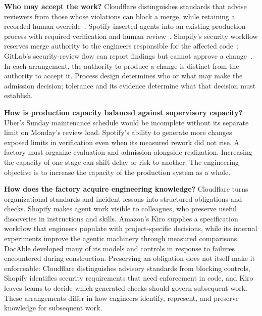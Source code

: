 \textbf{Who may accept the work?} Cloudflare distinguishes standards that advise reviewers from those whose violations can block a merge, while retaining a recorded human override~\citep{skidmore2026review}. Spotify inserted agents into an existing production process with required verification and human review~\citep{charas2025honk,curtis2026spotifyqcon}. Shopify's security workflow reserves merge authority to the engineers responsible for the affected code~\citep{son2026security}; GitLab's security-review flow can report findings but cannot approve a change~\citep{gitlab2026securityreview}. In each arrangement, the authority to produce a change is distinct from the authority to accept it. Process design determines who or what may make the admission decision; tolerance and its evidence determine what that decision must establish.


\textbf{How is production capacity balanced against supervisory capacity?} Uber's Sunday maintenance schedule would be incomplete without its separate limit on Monday's review load. Spotify's ability to generate more changes exposed limits in verification even when its measured rework did not rise. A factory must organize evaluation and admission alongside realization. Increasing the capacity of one stage can shift delay or risk to another. The engineering objective is to increase the capacity of the production system as a whole.


\textbf{How does the factory acquire engineering knowledge?} Cloudflare turns organizational standards and incident lessons into structured obligations and checks. Shopify makes agent work visible to colleagues, who preserve useful discoveries in instructions and skills. Amazon's Kiro supplies a specification workflow that engineers populate with project-specific decisions, while its internal experiments improve the agentic machinery through measured comparisons. DocAble developed many of its models and controls in response to failures encountered during construction. Preserving an obligation does not itself make it enforceable: Cloudflare distinguishes advisory standards from blocking controls, Shopify identifies security requirements that need enforcement in code, and Kiro leaves teams to decide which generated checks should govern subsequent work. These arrangements differ in how engineers identify, represent, and preserve knowledge for subsequent work.

